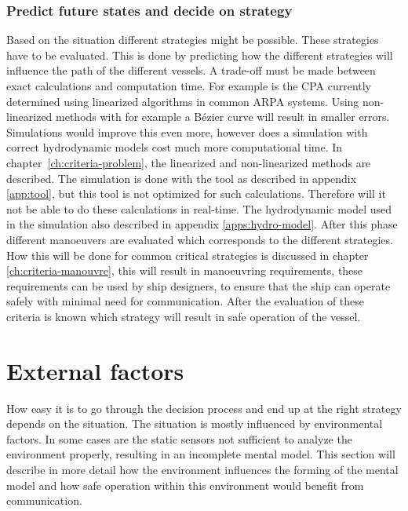 \subsubsection{Predict future states and decide on strategy}
Based on the situation different strategies might be possible. These strategies have to be evaluated. This is done by predicting how the different strategies will influence the path of the different vessels. A trade-off must be made between exact calculations and computation time. For example is the \acf{CPA} currently determined using linearized algorithms in common \ac{ARPA} systems. Using non-linearized methods with for example a Bézier curve will result in smaller errors. Simulations would improve this even more, however does a simulation with correct hydrodynamic models cost much more computational time. In chapter~\ref{ch:criteria-problem}, the linearized and non-linearized methods are described. The simulation is done with the tool as described in appendix \ref{app:tool}, but this tool is not optimized for such calculations. Therefore will it not be able to do these calculations in real-time. The hydrodynamic model used in the simulation also described in appendix \ref{apps:hydro-model}. After this phase different manoeuvers are evaluated which corresponds to the different strategies. How this will be done for common critical strategies is discussed in chapter \ref{ch:criteria-manouvre}, this will result in manoeuvring requirements, these requirements can be used by ship designers, to ensure that the ship can operate safely with minimal need for communication.
After the evaluation of these criteria is known which strategy will result in safe operation of the vessel.

\newpage
\section{External factors}
How easy it is to go through the decision process and end up at the right strategy depends on the situation. The situation is mostly influenced by environmental factors. In some cases are the static sensors not sufficient to analyze the environment properly, resulting in an incomplete mental model. This section will describe in more detail how the environment influences the forming of the mental model and how safe operation within this environment would benefit from communication. 

